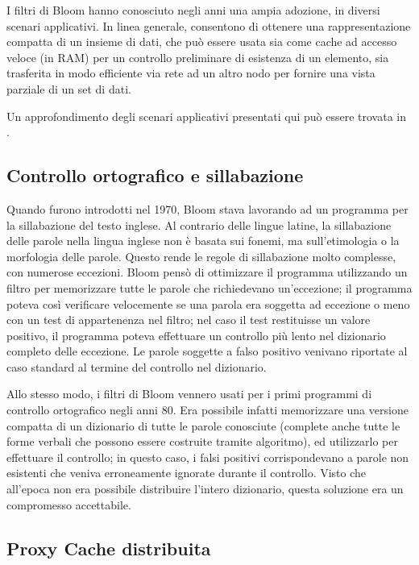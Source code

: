I filtri di Bloom hanno conosciuto negli anni una ampia adozione, in diversi scenari applicativi. 
In linea generale, consentono di ottenere una rappresentazione compatta di un insieme di dati,
che può essere usata sia come cache ad accesso veloce (in RAM) per un controllo preliminare
di esistenza di un elemento, sia trasferita in modo efficiente via rete ad un altro nodo per
fornire una vista parziale di un set di dati.

Un approfondimento degli scenari applicativi presentati qui può essere trovata in
\cite{bloomnetwork}.

\subsection{Controllo ortografico e sillabazione}

Quando furono introdotti nel 1970, Bloom stava lavorando ad un programma per la sillabazione del
testo inglese. Al contrario delle lingue latine, la sillabazione delle parole nella lingua inglese 
non è basata sui fonemi, ma sull'etimologia o la morfologia delle parole. Questo rende le regole
di sillabazione molto complesse, con numerose eccezioni. Bloom pensò di ottimizzare il programma
utilizzando un filtro per memorizzare tutte le parole che richiedevano un'eccezione; il programma
poteva così verificare velocemente se una parola era soggetta ad eccezione o meno con un test
di appartenenza nel filtro; nel caso il test restituisse un valore positivo, il programma poteva
effettuare un controllo più lento nel dizionario completo delle eccezione. Le parole soggette
a falso positivo venivano riportate al caso standard al termine del controllo nel dizionario.

Allo stesso modo, i filtri di Bloom vennero usati per i primi programmi di controllo ortografico
negli anni 80. Era possibile infatti memorizzare una versione compatta di un dizionario di tutte le
parole conosciute (complete anche tutte le forme verbali che possono essere costruite tramite
algoritmo), ed utilizzarlo per effettuare il controllo; in questo caso, i falsi positivi
corrispondevano a parole non esistenti che veniva erroneamente ignorate durante il controllo. Visto
che all'epoca non era possibile distribuire l'intero dizionario, questa soluzione era un compromesso
accettabile.

\subsection{Proxy Cache distribuita}

